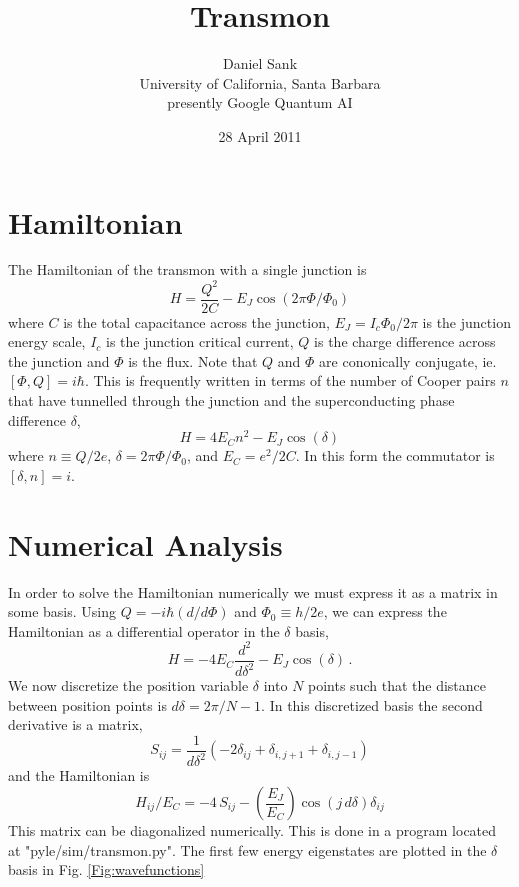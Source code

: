 \documentclass[twocolumn]{article}
\title{Transmon}
\author{Daniel Sank \\
\small{University of California, Santa Barbara}\\
\small{presently Google Quantum AI}}
\date{28 April 2011}
\begin{document}
\maketitle

\section{Hamiltonian}
The Hamiltonian of the transmon with a single junction is
\begin{equation}
H = \frac{Q^2}{2C} - E_J \cos(2 \pi \Phi/\Phi_0)
\end{equation}
where $C$ is the total capacitance across the junction, $E_J = I_c \Phi_0 / 2\pi$ is the junction energy scale, $I_c$ is the junction critical current, $Q$ is the charge difference across the junction and $\Phi$ is the flux.
Note that $Q$ and $\Phi$ are cononically conjugate, ie. $[\Phi, Q] = i\hbar$.
This is frequently written in terms of the number of Cooper pairs $n$ that have tunnelled through the junction and the superconducting phase difference $\delta$,
\begin{equation}
H = 4 E_C n^2 - E_J \cos(\delta)
\end{equation}
where $n \equiv Q/2e$, $\delta = 2\pi \Phi/\Phi_0$, and $E_C = e^2/2C$. In this form the commutator is $[\delta, n] = i$.

\section{Numerical Analysis}
In order to solve the Hamiltonian numerically we must express it as a matrix in some basis.
Using $Q = -i \hbar (d/d\Phi)$ and $\Phi_0 \equiv h/2e$, we can express the Hamiltonian as a differential operator in the $\delta$ basis,
\begin{equation}
H = -4 E_C \frac{d^2}{d\delta^2} - E_J \cos(\delta) \, .
\end{equation}
We now discretize the position variable $\delta$ into $N$ points such that the distance between position points is $d\delta = 2\pi/N-1$. In this discretized basis the second derivative is a matrix,
\begin{equation}
S_{ij} = \frac{1}{d\delta^2} \left( -2\delta_{ij} + \delta_{i,j+1} + \delta_{i,j-1} \right) \end{equation}
and the Hamiltonian is \begin{equation}
H_{ij}/E_C = -4\,S_{ij} - \left( \frac{E_J}{E_C} \right) \cos(j \, d\delta) \delta_{ij} \end{equation}
This matrix can be diagonalized numerically. This is done in a program located at "pyle/sim/transmon.py". The first few energy eigenstates are plotted in the $\delta$ basis in Fig. \ref{Fig:wavefunctions}
\end{document}
